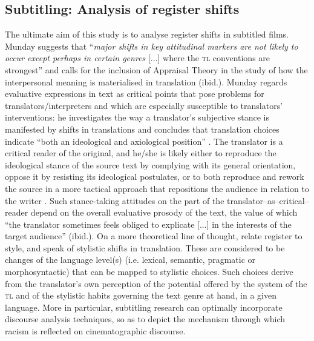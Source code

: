 \documentclass[output=paper]{LSP/langsci}
\begin{document}
\subsection{Subtitling: Analysis of register shifts} \label{sec:2:2:4}
The ultimate aim of this study is to analyse register shifts in subtitled films. Munday suggests that “\textit{major shifts in key attitudinal markers are not likely to occur except perhaps in certain genres} [...] where the \textsc{tl} conventions are strongest” \citep[159--160; our emphasis]{Munday2012} and calls for the inclusion of Appraisal Theory in the study of how the interpersonal meaning is materialised in translation (ibid.). Munday regards evaluative expressions in text as critical points that pose problems for translators/interpreters and which are especially susceptible to translators' interventions: he investigates the way a translator's subjective stance is manifested by shifts in translations and concludes that translation choices indicate “both an ideological and axiological position” \citep[155]{Munday2012}. The translator is a critical reader of the original, and he/she is likely either to reproduce the ideological stance of the source text by complying with its general orientation, oppose it by resisting its ideological postulates, or to both reproduce and rework the source in a more tactical approach that repositions the audience in relation to the writer \citep[157]{Munday2012}. Such stance-taking attitudes on the part of the translator–as–critical–reader depend on the overall evaluative prosody of the text, the value of which “the translator sometimes feels obliged to explicate [...] in the interests of the target audience” (ibid.). On a more theoretical line of thought, \citet[215]{Batsalia2010} relate register to style, and speak of stylistic shifts in translation. These are considered to be changes of the language level(s) (i.e. lexical, semantic, pragmatic or morphosyntactic) that can be mapped to stylistic choices. Such choices derive from the translator's own perception of the potential offered by the system of the \textsc{tl} and of the stylistic habits governing the text genre at hand, in a given language. More in particular, subtitling research can optimally incorporate discourse analysis techniques, so as to depict the mechanism through which racism is reflected on cinematographic discourse.
\end{document}
